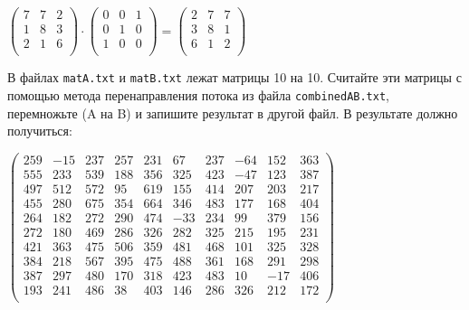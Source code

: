 \documentclass[10pt]{article}
\begin{document}
\begin{center}

$
\begin{pmatrix}
7 & 7 & 2 \\
1 & 8 & 3 \\
2 & 1 & 6 \\
\end{pmatrix}  \cdot 
\begin{pmatrix}
0 & 0 & 1 \\
0 & 1 & 0 \\
1 & 0 & 0 \\
\end{pmatrix}
=
\begin{pmatrix}
2 & 7 & 7 \\
3 & 8 & 1 \\
6 & 1 & 2 \\
\end{pmatrix}
$
\end{center}
В файлах \texttt{matA.txt} и \texttt{matB.txt} лежат матрицы 10 на 10. Считайте эти матрицы с помощью метода перенаправления потока из файла \texttt{combinedAB.txt}, перемножьте (A на B) и запишите результат в другой файл. В результате должно получиться:
\begin{center}
$
\begin{pmatrix}
259 & -15 & 237 & 257 &  231 &  67  & 237  & -64  & 152  & 363 \\
555 & 233 & 539 & 188 &  356 &  325 &  423 &  -47 &  123 &  387 \\
497 & 512 & 572 & 95  & 619  & 155  & 414  & 207  & 203  & 217 \\
455 & 280 & 675 & 354 &  664 &  346 &  483 &  177 &  168 &  404 \\
264 & 182 & 272 & 290 &  474 &  -33 &  234 &  99  & 379  & 156 \\
272 & 180 & 469 & 286 &  326 &  282 &  325 &  215 &  195 &  231 \\
421 & 363 & 475 & 506 &  359 &  481 &  468 &  101 &  325 &  328 \\
384 & 218 & 567 & 395 &  475 &  488 &  361 &  168 &  291 &  298 \\
387 & 297 & 480 & 170 &  318 &  423 &  483 &  10  & -17  & 406 \\
193 & 241 & 486 & 38  & 403  & 146  & 286  & 326  & 212  & 172 \\
\end{pmatrix}
$
\end{center}
\end{document}
